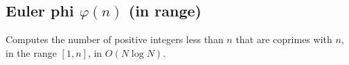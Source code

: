 \subsection{Euler phi $\varphi(n)$ (in range)}

Computes the number of positive integers less than $n$ that are coprimes with $n$, in the range $[1, n]$, in $O(N\log{N})$.
